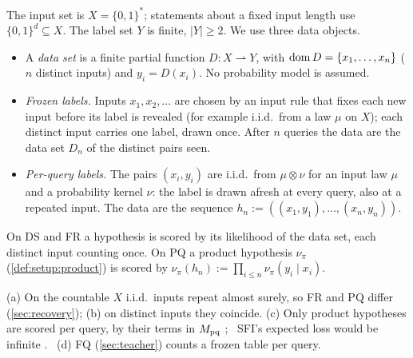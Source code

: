 \begin{definition}[Data]\label{def:setup:data}
The input set is $X=\{0,1\}^*$; statements about a fixed input length use $\{0,1\}^d\subseteq X$. The label set $Y$ is finite, $|Y|\ge2$. We use three data objects.
\begin{itemize}[itemsep=0pt,topsep=2pt]
\item[(DS)] A \emph{data set} is a finite partial function $D:X\rightharpoonup Y$, with $\operatorname{dom} D=\{x_1,\dots,x_n\}$ ($n$ distinct inputs) and $y_i=D(x_i)$. No probability model is assumed.
\item[(FR)] \emph{Frozen labels.} Inputs $x_1,x_2,\dots$ are chosen by an input rule that fixes each new input before its label is revealed (for example i.i.d.\ from a law $\mu$ on $X$); each distinct input carries one label, drawn once. After $n$ queries the data are the data set $D_n$ of the distinct pairs seen.
\item[(PQ)] \emph{Per-query labels.} The pairs $(x_i,y_i)$ are i.i.d.\ from $\mu\otimes\nu$ for an input law $\mu$ and a probability kernel $\nu$: the label is drawn afresh at every query, also at a repeated input. The data are the sequence $h_n:=((x_1,y_1),\dots,(x_n,y_n))$.
\end{itemize}
On DS and FR a hypothesis is scored by its likelihood of the data set, each distinct input counting once. On PQ a product hypothesis $\nu_\pi$ (\cref{def:setup:product}) is scored by $\nu_\pi(h_n):=\prod_{i\le n}\nu_\pi(y_i\mid x_i)$.
\end{definition}

\begin{remark}\label{rem:setup:objects}
(a) On the countable $X$ i.i.d.\ inputs repeat almost surely, so FR and PQ differ (\cref{sec:recovery}); (b) on distinct inputs they coincide. (c) Only product hypotheses are scored per query, by their terms in $M_{\mathrm{pq}}$ \citep[Proposition~5.7]{claudeSFI2026fundamentals};%
\ SFI's expected loss would be infinite \citep[Proposition~5.6]{claudeSFI2026fundamentals}.%
\ (d) FQ (\cref{sec:teacher}) counts a frozen table per query.
\end{remark}

